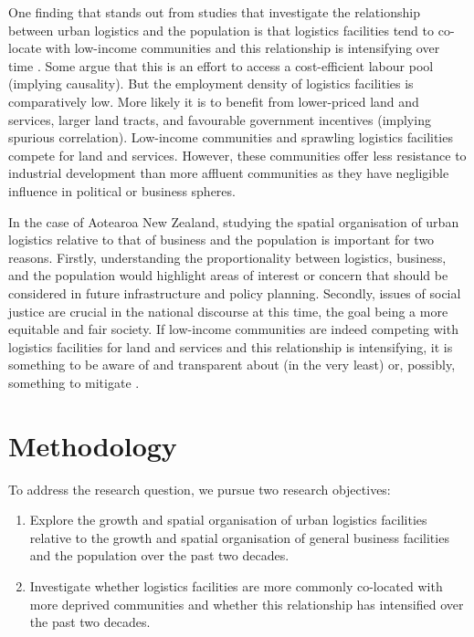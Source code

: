 \documentclass[3p, a4paper, authoryear, 11pt, fleqn, review]{elsarticle}
\newcommand{\nmt}[1]{{\color{ForestGreen}{~(nmt: #1)}}}
\begin{document}
One finding that stands out from studies that investigate the relationship between urban logistics and the population is that logistics facilities tend to co-locate with low-income communities and this relationship is intensifying over time \citep{Jaller_etal2017, Strale2020}. Some argue that this is an effort to access a cost-efficient labour pool (implying causality). But the employment density of logistics facilities is comparatively low. More likely it is to benefit from lower-priced land and services, larger land tracts, and favourable government incentives (implying spurious correlation). Low-income communities and sprawling logistics facilities compete for land and services. However, these communities offer less resistance to industrial development than more affluent communities as they have negligible influence in political or business spheres. 

In the case of Aotearoa New Zealand, studying the spatial organisation of urban logistics relative to that of business and the population is important for two reasons. Firstly, understanding the proportionality between logistics, business, and the population would highlight areas of interest or concern that should be considered in future infrastructure and policy planning. Secondly, issues of social justice are crucial in the national discourse at this time, the goal being a more equitable and fair society. If low-income communities are indeed competing with logistics facilities for land and services and this relationship is intensifying, it is something to be aware of and transparent about (in the very least) or, possibly, something to mitigate \nmt{mediate?}.

\nmt{linking sentence?}

\section{Methodology}
\label{sec:Method}

To address the research question, we pursue two research objectives:
\begin{enumerate}
\item Explore the growth and spatial organisation of urban logistics facilities relative to the growth and spatial organisation of general business facilities and the population over the past two decades.
\item Investigate whether logistics facilities are more commonly co-located with more deprived communities and whether this relationship has intensified over the past two decades. 	
\end{enumerate}
\end{document}
